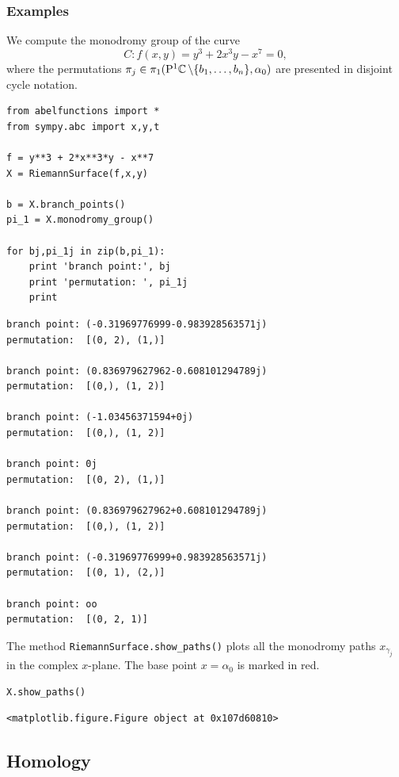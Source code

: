 %
\subsubsection*{Examples}
%

We compute the monodromy group of the curve
\[
  C : f(x,y) = y^3 + 2x^3y - x^7 = 0,
\]
where the permutations $\pi_j \in \pi_1(\mathrm{P}^1 \!\operatorname{\mathbb{C}} \backslash \{b_1, \ldots,
b_n\}, \alpha_0)$ are presented in disjoint cycle notation.
\begin{lstlisting}
from abelfunctions import *
from sympy.abc import x,y,t

f = y**3 + 2*x**3*y - x**7
X = RiemannSurface(f,x,y)

b = X.branch_points()
pi_1 = X.monodromy_group()

for bj,pi_1j in zip(b,pi_1):
    print 'branch point:', bj
    print 'permutation: ', pi_1j
    print
\end{lstlisting}
\begin{lstlisting}
branch point: (-0.31969776999-0.983928563571j)
permutation:  [(0, 2), (1,)]

branch point: (0.836979627962-0.608101294789j)
permutation:  [(0,), (1, 2)]

branch point: (-1.03456371594+0j)
permutation:  [(0,), (1, 2)]

branch point: 0j
permutation:  [(0, 2), (1,)]

branch point: (0.836979627962+0.608101294789j)
permutation:  [(0,), (1, 2)]

branch point: (-0.31969776999+0.983928563571j)
permutation:  [(0, 1), (2,)]

branch point: oo
permutation:  [(0, 2, 1)]
\end{lstlisting}
The method \verb=RiemannSurface.show_paths()= plots all the monodromy paths
$x_{\gamma_j}$ in the complex $x$-plane. The base point $x=\alpha_0$ is marked
in red.
\begin{lstlisting}[firstnumber=14]
X.show_paths()
\end{lstlisting}
\begin{lstlisting}
<matplotlib.figure.Figure object at 0x107d60810>
\end{lstlisting}
\begin{center}
\end{center}


\subsection{Homology}\label{subsec:background-homology}

